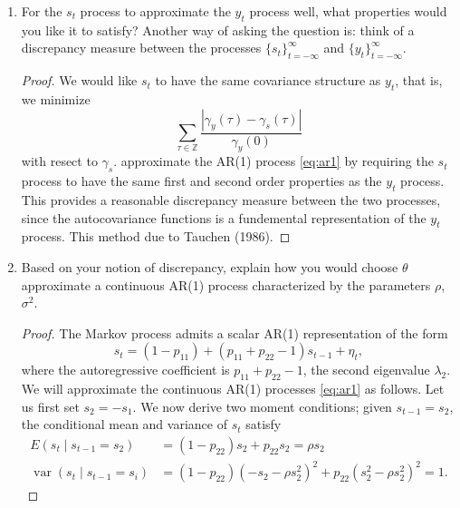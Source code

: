 \documentclass[oneside,reqno]{amsart}
\DeclareMathOperator{\var}{var}
\newcommand{\Z}{\mathds Z}
\theoremstyle{definition}
\begin{document}
\begin{enumerate}[label=(\roman*)]
\begin{proof}
\begin{python3code}
def sample(pi):
    a = 0.0
    U = uniform(0,1)
    for i in range(len(pi)):
        if a < U <= a + pi[i]:
            return i
        a += pi[i]
        
class MarkovChain:
    def __init__(self, p=None, X=None):
        self.p, self.X = p, X
        
    def update(self):
        self.X = sample(self.p[self.X])
        
    def sample_path(self, n):
        path = []
        for i in range(n):
            path.append(self.X)
            self.update()
        return path
\end{python3code}        
\end{proof}
\item
For the $s_t$ process to approximate the $y_t$ process well, what properties would you like it to satisfy? Another way of asking the question is: think of a discrepancy measure between the processes $\{s_t\}_{t=-\infty}^\infty$ and $\{y_t\}_{t=-\infty}^\infty$.
\begin{proof}
We would like $s_t$ to have the same covariance structure as $y_t$, that is, we minimize 
\[
	\sum_{\tau\in \Z} \frac{|\gamma_y(\tau) - \gamma_s(\tau)|}{\gamma_y(0)}
\] 
with resect to $\gamma_s$. approximate the AR(1) process \eqref{eq:ar1} by requiring the $s_t$ process to have the same first and second order properties as the $y_t$ process. This provides a reasonable discrepancy measure between the two processes, since the autocovariance functions is a fundemental representation of the $y_t$ process. This method due to Tauchen (1986). 
\end{proof}
\item
Based on your notion of discrepancy, explain how you would choose $\theta$  approximate a continuous AR(1) process characterized by the parameters $\rho$, $\sigma^2$.
\begin{proof}
The Markov process admits a scalar AR(1) representation of the form 
\[
	s_t  = (1 - p_{11}) + (p_{11} + p_{22}-1) s_{t-1} + \eta_t,
\]
where the autoregressive coefficient is $p_{11} + p_{22}-1$, the second eigenvalue $\lambda_2$. We will approximate the continuous AR(1) processes \eqref{eq:ar1} as follows. Let us first set $s_2 =  -s_1$. We now derive two moment conditions; given $s_{t-1}=s_2$, the conditional mean and variance of $s_t$ satisfy 
\begin{align*}
	E(s_t \mid s_{t-1}=s_2) &= (1-p_{22}) s_2  + p_{22}s_2 = \rho s_2 \\
	\var(s_t \mid s_{t-1} = s_i) &= (1-p_{22}) (-s_2 -\rho s_2^2)^2 + p_{22}(s_2^2 - \rho s_2^2)^2 = 1.

\end{align*}
\end{proof}
\end{enumerate}
\end{document}
